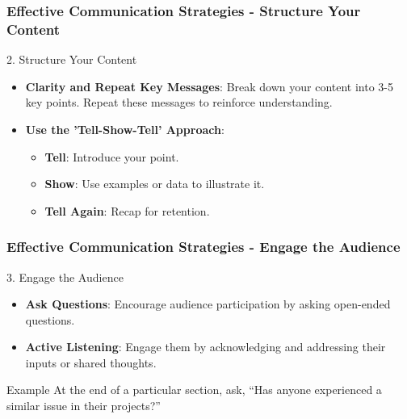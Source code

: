 \documentclass[aspectratio=169]{beamer}
\begin{document}
\begin{frame}[fragile]
    \frametitle{Effective Communication Strategies - Structure Your Content}
    \begin{block}{2. Structure Your Content}
        \begin{itemize}
            \item \textbf{Clarity and Repeat Key Messages}: Break down your content into 3-5 key points. Repeat these messages to reinforce understanding.
            \item \textbf{Use the 'Tell-Show-Tell' Approach}:
                \begin{itemize}
                    \item \textbf{Tell}: Introduce your point.
                    \item \textbf{Show}: Use examples or data to illustrate it.
                    \item \textbf{Tell Again}: Recap for retention.
                \end{itemize}
        \end{itemize}
    \end{block}
\end{frame}

\begin{frame}[fragile]
    \frametitle{Effective Communication Strategies - Engage the Audience}
    \begin{block}{3. Engage the Audience}
        \begin{itemize}
            \item \textbf{Ask Questions}: Encourage audience participation by asking open-ended questions.
            \item \textbf{Active Listening}: Engage them by acknowledging and addressing their inputs or shared thoughts.
        \end{itemize}
    \end{block}
    
    \begin{block}{Example}
        At the end of a particular section, ask, “Has anyone experienced a similar issue in their projects?”
    \end{block}
\end{frame}
\end{document}
